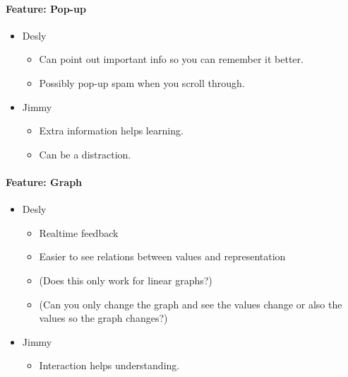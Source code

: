 \documentclass[main.tex]{subfiles}
\begin{document}
\paragraph{Feature: Pop-up}
\begin{itemize}
	\item Desly
		\begin{itemize}
			\item Can point out important info so you can remember it better.
			\item Possibly pop-up spam when you scroll through.
		\end{itemize}
	\item Jimmy
		\begin{itemize}
			\item Extra information helps learning.
			\item Can be a distraction.
		\end{itemize}
\end{itemize}

\paragraph{Feature: Graph}
\begin{itemize}
	\item Desly
		\begin{itemize}
			\item Realtime feedback
			\item Easier to see relations between values and representation
			\item (Does this only work for linear graphs?)
			\item (Can you only change the graph and see the values change or also the values so the graph changes?)
		\end{itemize}
	\item Jimmy
		\begin{itemize}
			\item Interaction helps understanding.
		\end{itemize}
\end{itemize}
\end{document}
